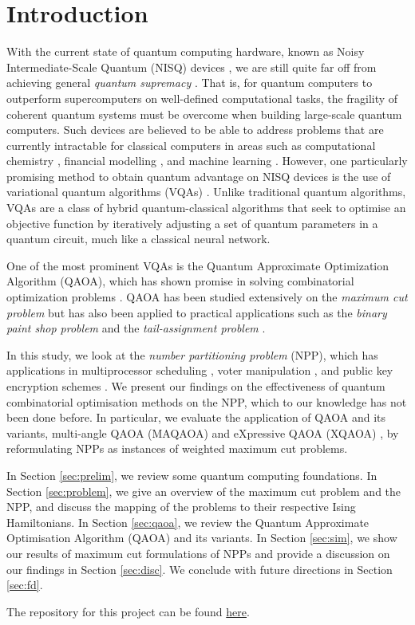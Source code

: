 \section{Introduction}

With the current state of quantum computing hardware, known as Noisy Intermediate-Scale Quantum (NISQ) devices \cite{Preskill2018quantumcomputingin}, we are still quite far off from achieving general \emph{quantum supremacy} \cite{boixo2018characterizing}. That is, for quantum computers to outperform supercomputers on well-defined computational tasks, the fragility of coherent quantum systems must be overcome when building large-scale quantum computers. Such devices are believed to be able to address problems that are currently intractable for classical computers in areas such as computational chemistry \cite{mcardle2020quantum}, financial modelling \cite{orus2019quantum}, and machine learning \cite{dunjko2016quantum}. However, one particularly promising method to obtain quantum advantage on NISQ devices is the use of variational quantum algorithms (VQAs) \cite{cerezo2021variational}. Unlike traditional quantum algorithms, VQAs are a class of hybrid quantum-classical algorithms that seek to optimise an objective function by iteratively adjusting a set of quantum parameters in a quantum circuit, much like a classical neural network.

One of the most prominent VQAs is the Quantum Approximate Optimization Algorithm (QAOA), which has shown promise in solving combinatorial optimization problems \cite{farhi2014quantum}. QAOA has been studied extensively on the \emph{maximum cut problem} but has also been applied to practical applications such as the \emph{binary paint shop problem} \cite{streif2021beating} and the \emph{tail-assignment problem} \cite{vikstaal2020applying}.

In this study, we look at the \emph{number partitioning problem} (NPP), which has applications in multiprocessor scheduling \cite{sarkar1987partitioning}, voter manipulation \cite{walsh2009really}, and public key encryption schemes \cite{merkle1978hiding}. We present our findings on the effectiveness of quantum combinatorial optimisation methods on the NPP, which to our knowledge has not been done before. In particular, we evaluate the application of QAOA and its variants, multi-angle QAOA (MAQAOA) \cite{herrman2022multi} and eXpressive QAOA (XQAOA) \cite{vijendran2023expressive}, by reformulating NPPs as instances of weighted maximum cut problems. 

In Section \ref{sec:prelim}, we review some quantum computing foundations. In Section \ref{sec:problem}, we give an overview of the maximum cut problem and the NPP, and discuss the mapping of the problems to their respective Ising Hamiltonians. In Section \ref{sec:qaoa}, we review the Quantum Approximate Optimisation Algorithm (QAOA) and its variants. In Section \ref{sec:sim}, we show our results of maximum cut formulations of NPPs and provide a discussion on our findings in Section \ref{sec:disc}. We conclude with future directions in Section \ref{sec:fd}.

The repository for this project can be found \href{https://github.com/yangdabei/quantum-number-partitioning}{here}.

